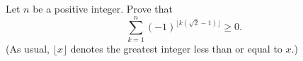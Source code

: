 Let $n$ be a positive integer. Prove that
\[
\sum_{k=1}^n (-1)^{\lfloor k(\sqrt{2}-1) \rfloor} \geq 0.
\]
(As usual, $\lfloor x \rfloor$ denotes the greatest integer less than or equal to $x$.)
